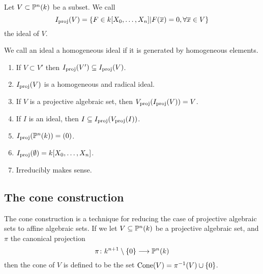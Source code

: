 \begin{definition}
Let $V\subset \P^n(k)$ be a subset. We call 
\begin{equation*}
    \Ip(V) = \{ F\in k[X_0, \ldots, X_n] \vert F(\x)=0, \forall \x\in V \}
\end{equation*}
the ideal of $V$. 
\end{definition}

\begin{definition}
We call an ideal a homogeneous ideal if it is generated by homogeneous elements. 
\end{definition}

\begin{enumerate}
    \item If $V\subset V'$ then $\Ip(V')\subseteq \Ip(V)$. 
    \item $\Ip(V)$ is a homogeneous and radical ideal.
    \item If $V$ is a projective algebraic set, then $\Vp(\Ip(V))=V$.
    \item If $I$ is an ideal, then $I\subseteq \Ip(\Vp(I))$.
    \item $\Ip(\P^n(k))=(0)$. 
    \item $\Ip(\emptyset) = k[X_0, \ldots, X_n]$.
    \item Irreducibly makes sense. 
\end{enumerate}

\subsection{The cone construction}

The cone construction is a technique for reducing the case of projective algebraic sets to affine algebraic sets. If we let $V\subseteq \P^n(k)$ be a projective algebraic set, and $\pi$ the canonical projection
\begin{equation*}
    \pi\colon k^{n+1}\setminus \{0\} \longrightarrow \P^n(k)
\end{equation*}
then the cone of $V$ is defined to be the set $\Cone(V)=\pi^{-1}(V)\cup\{0\}$. 

